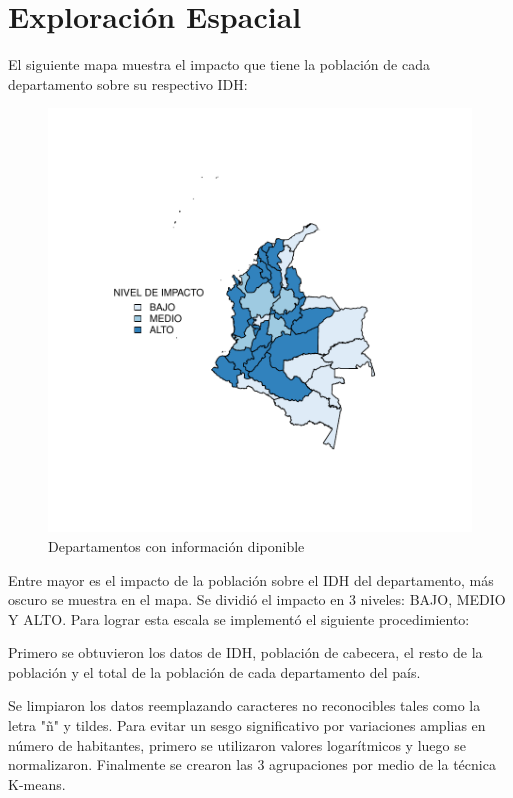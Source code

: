 \documentclass{article}
\begin{document}




\section{Exploración Espacial}

El siguiente mapa muestra el impacto que tiene la población de cada departamento sobre su respectivo IDH:








 
 
\begin{figure}[h]
\centering
\begin{adjustbox}{width=8cm,height=6cm,clip,trim=1.5cm 2cm 0cm 2.5cm}
\includegraphics{basico32departamentos-plotMap0}
\end{adjustbox}
\caption{Departamentos con información diponible}\label{rawmap}
\end{figure}

Entre mayor es el impacto de la población sobre el IDH del departamento, más oscuro se muestra en el mapa. Se dividió el impacto en 3 niveles: BAJO, MEDIO Y ALTO.
Para lograr esta escala se implementó el siguiente procedimiento:

Primero se obtuvieron los datos de IDH, población de cabecera, el resto de la población y el total de la población de cada departamento del país.

Se limpiaron los datos reemplazando caracteres no reconocibles tales como la letra "ñ" y tildes.
Para evitar un sesgo significativo por variaciones amplias en número de habitantes, primero se utilizaron valores logarítmicos y luego se normalizaron. Finalmente se crearon las 3 agrupaciones por medio de la técnica K-means.
\end{document}
